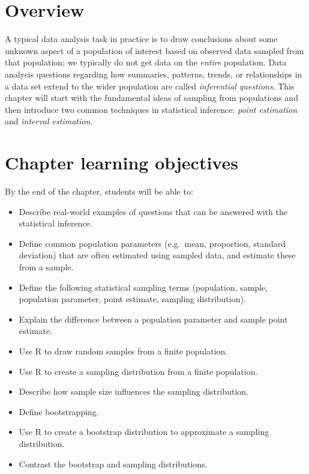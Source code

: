 \documentclass[
]{krantz}
\providecommand{\tightlist}{%
  \setlength{\itemsep}{0pt}\setlength{\parskip}{0pt}}
\begin{document}
\hypertarget{overview-9}{%
\section{Overview}\label{overview-9}}

A typical data analysis task in practice is to draw conclusions about some unknown
aspect of a population of interest based on observed data sampled from that
population; we typically do not get data on the \emph{entire} population.
Data analysis questions regarding how summaries,
patterns, trends, or relationships in a data set
extend to the wider population are called \emph{inferential questions}. This chapter will start
with the fundamental ideas of sampling from populations and then introduce two common techniques in statistical inference: \emph{point estimation} and
\emph{interval estimation}.

\hypertarget{chapter-learning-objectives-10}{%
\section{Chapter learning objectives}\label{chapter-learning-objectives-10}}

By the end of the chapter, students will be able to:

\begin{itemize}
\tightlist
\item
  Describe real-world examples of questions that can be answered with the statistical inference.
\item
  Define common population parameters (e.g.~mean, proportion, standard deviation) that are often estimated using sampled data, and estimate these from a sample.
\item
  Define the following statistical sampling terms (population, sample, population parameter, point estimate, sampling distribution).
\item
  Explain the difference between a population parameter and sample point estimate.
\item
  Use R to draw random samples from a finite population.
\item
  Use R to create a sampling distribution from a finite population.
\item
  Describe how sample size influences the sampling distribution.
\item
  Define bootstrapping.
\item
  Use R to create a bootstrap distribution to approximate a sampling distribution.
\item
  Contrast the bootstrap and sampling distributions.
\end{itemize}
\end{document}
